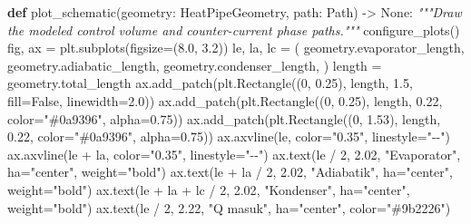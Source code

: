\documentclass[
  12pt,
  12pt,a4paper,oneside]{report}
\newenvironment{Shaded}{}{}
\newcommand{\CommentTok}[1]{\textcolor[rgb]{0.38,0.63,0.69}{\textit{#1}}}
\newcommand{\DecValTok}[1]{\textcolor[rgb]{0.25,0.63,0.44}{#1}}
\newcommand{\FloatTok}[1]{\textcolor[rgb]{0.25,0.63,0.44}{#1}}
\newcommand{\KeywordTok}[1]{\textcolor[rgb]{0.00,0.44,0.13}{\textbf{#1}}}
\newcommand{\NormalTok}[1]{#1}
\newcommand{\OperatorTok}[1]{\textcolor[rgb]{0.40,0.40,0.40}{#1}}
\newcommand{\StringTok}[1]{\textcolor[rgb]{0.25,0.44,0.63}{#1}}
\newcommand{\VariableTok}[1]{\textcolor[rgb]{0.10,0.09,0.49}{#1}}
\begin{document}
\begin{Shaded}
\begin{Highlighting}[]
\KeywordTok{def}\NormalTok{ plot\_schematic(geometry: HeatPipeGeometry, path: Path) }\OperatorTok{{-}\textgreater{}} \VariableTok{None}\NormalTok{:}
    \CommentTok{"""Draw the modeled control volume and counter{-}current phase paths."""}
\NormalTok{    configure\_plots()}
\NormalTok{    fig, ax }\OperatorTok{=}\NormalTok{ plt.subplots(figsize}\OperatorTok{=}\NormalTok{(}\FloatTok{8.0}\NormalTok{, }\FloatTok{3.2}\NormalTok{))}
\NormalTok{    le, la, lc }\OperatorTok{=}\NormalTok{ (}
\NormalTok{        geometry.evaporator\_length, geometry.adiabatic\_length,}
\NormalTok{        geometry.condenser\_length,}
\NormalTok{    )}
\NormalTok{    length }\OperatorTok{=}\NormalTok{ geometry.total\_length}
\NormalTok{    ax.add\_patch(plt.Rectangle((}\DecValTok{0}\NormalTok{, }\FloatTok{0.25}\NormalTok{), length, }\FloatTok{1.5}\NormalTok{, fill}\OperatorTok{=}\VariableTok{False}\NormalTok{, linewidth}\OperatorTok{=}\FloatTok{2.0}\NormalTok{))}
\NormalTok{    ax.add\_patch(plt.Rectangle((}\DecValTok{0}\NormalTok{, }\FloatTok{0.25}\NormalTok{), length, }\FloatTok{0.22}\NormalTok{, color}\OperatorTok{=}\StringTok{"\#0a9396"}\NormalTok{, alpha}\OperatorTok{=}\FloatTok{0.75}\NormalTok{))}
\NormalTok{    ax.add\_patch(plt.Rectangle((}\DecValTok{0}\NormalTok{, }\FloatTok{1.53}\NormalTok{), length, }\FloatTok{0.22}\NormalTok{, color}\OperatorTok{=}\StringTok{"\#0a9396"}\NormalTok{, alpha}\OperatorTok{=}\FloatTok{0.75}\NormalTok{))}
\NormalTok{    ax.axvline(le, color}\OperatorTok{=}\StringTok{"0.35"}\NormalTok{, linestyle}\OperatorTok{=}\StringTok{"{-}{-}"}\NormalTok{)}
\NormalTok{    ax.axvline(le }\OperatorTok{+}\NormalTok{ la, color}\OperatorTok{=}\StringTok{"0.35"}\NormalTok{, linestyle}\OperatorTok{=}\StringTok{"{-}{-}"}\NormalTok{)}
\NormalTok{    ax.text(le }\OperatorTok{/} \DecValTok{2}\NormalTok{, }\FloatTok{2.02}\NormalTok{, }\StringTok{"Evaporator"}\NormalTok{, ha}\OperatorTok{=}\StringTok{"center"}\NormalTok{, weight}\OperatorTok{=}\StringTok{"bold"}\NormalTok{)}
\NormalTok{    ax.text(le }\OperatorTok{+}\NormalTok{ la }\OperatorTok{/} \DecValTok{2}\NormalTok{, }\FloatTok{2.02}\NormalTok{, }\StringTok{"Adiabatik"}\NormalTok{, ha}\OperatorTok{=}\StringTok{"center"}\NormalTok{, weight}\OperatorTok{=}\StringTok{"bold"}\NormalTok{)}
\NormalTok{    ax.text(le }\OperatorTok{+}\NormalTok{ la }\OperatorTok{+}\NormalTok{ lc }\OperatorTok{/} \DecValTok{2}\NormalTok{, }\FloatTok{2.02}\NormalTok{, }\StringTok{"Kondenser"}\NormalTok{, ha}\OperatorTok{=}\StringTok{"center"}\NormalTok{, weight}\OperatorTok{=}\StringTok{"bold"}\NormalTok{)}
\NormalTok{    ax.text(le }\OperatorTok{/} \DecValTok{2}\NormalTok{, }\FloatTok{2.22}\NormalTok{, }\StringTok{"Q masuk"}\NormalTok{, ha}\OperatorTok{=}\StringTok{"center"}\NormalTok{, color}\OperatorTok{=}\StringTok{"\#9b2226"}\NormalTok{)}

\end{Highlighting}
\end{Shaded}
\end{document}
